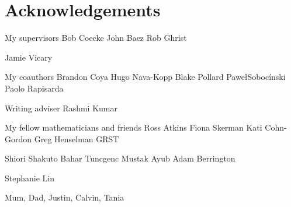 \section*{Acknowledgements}

My supervisors
Bob Coecke
John Baez
Rob Ghrist

Jamie Vicary

My coauthors
Brandon Coya
Hugo Nava-Kopp
Blake Pollard
Pawe\l Soboc\'inski
Paolo Rapisarda

Writing adviser Rashmi Kumar

My fellow mathematicians and friends
Ross Atkins
Fiona Skerman
Kati Cohn-Gordon
Greg Henselman
GRST 

Shiori Shakuto
Bahar Tuncgenc
Mustak Ayub
Adam Berrington


Stephanie Lin

Mum, Dad, Justin, Calvin, Tania

